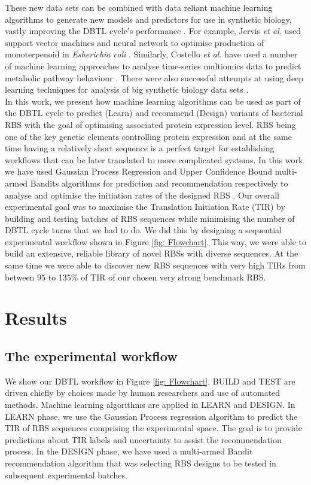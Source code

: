 \documentclass{article}
\begin{document}
These new data sets can be combined with data reliant machine learning algorithms to generate new models and predictors for use in synthetic biology, vastly improving the DBTL cycle's performance \cite{Camacho2018,Radivojevic2020,LAWSON2021}. 
For example, Jervis \emph{et al.} used support vector machines and neural network to optimise production of monoterpenoid in \emph{Esherichia coli} \cite{Jervis2019}.
Similarly, Costello \emph{et al.} have used a number of machine learning approaches to analyse time-series multiomics data to predict metabolic pathway behaviour \cite{Costello2018}.
There were also successful attempts at using deep learning techniques for analysis of big synthetic biology data sets \cite{Alipanahi2015,Angermueller2016}.\\
In this work, we present how machine learning algorithms can be used as part of the DBTL cycle to predict (Learn) and recommend (Design) variants of bacterial RBS with the goal of optimising associated protein expression level. 
RBS being one of the key genetic elements controlling protein expression and at the same time having a relatively short sequence is a perfect target for establishing workflows that can be later translated to more complicated systems.
In this work we have used Gaussian Process Regression \cite{Rasmussen2004} and Upper Confidence Bound multi-armed Bandits algorithms \cite{desautels2014parallelizing} for prediction and recommendation respectively to analyse and optimise the initiation rates of the designed RBS .
Our overall experimental goal was to maximise the Translation Initiation Rate (TIR) by building and testing batches of RBS sequences while minimising the number of DBTL cycle turns that we had to do.
We did this by designing a sequential experimental workflow shown in Figure \ref{fig: Flowchart}.
This way, we were able to build an extensive, reliable library of novel RBSs with diverse sequences.
At the same time we were able to discover new RBS sequences with very high TIRs from between 95 to 135\% of TIR of our chosen very strong benchmark RBS. 

\section{Results}

\subsection{The experimental workflow}

We show our DBTL workflow in Figure \ref{fig: Flowchart}.
BUILD and TEST are driven chiefly by choices made by human researchers and use of automated methods.
Machine learning algorithms are applied in LEARN and DESIGN.
In LEARN phase, we use the Gaussian Process regression algorithm to predict the TIR of RBS sequences comprising the experimental space.
The goal is to provide predictions about TIR labels and uncertainty to assist the recommendation process.
In the DESIGN phase, we have used a multi-armed Bandit recommendation algorithm that was selecting RBS designs to be tested in subsequent experimental batches.\\
\end{document}

